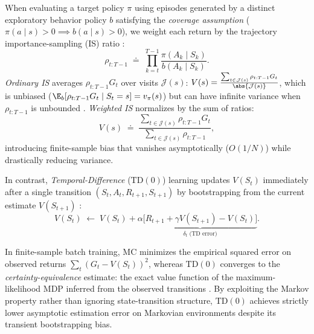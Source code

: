\documentclass[../../../../master.tex]{subfiles}
\begin{document}
When evaluating a target policy $\pi$ using episodes generated by a distinct exploratory behavior policy $b$ satisfying the \emph{coverage assumption} ($\pi(a \mid s) > 0 \implies b(a \mid s) > 0$), we weight each return by the trajectory importance-sampling (IS) ratio :
\begin{equation}
  \rho_{t:T-1} \;\doteq\; \prod_{k=t}^{T-1} \frac{\pi(A_k \mid S_k)}{b(A_k \mid S_k)}.
  \label{eq:td:is_ratio}
\end{equation}
\emph{Ordinary IS} averages $\rho_{t:T-1} G_t$ over visits $\mathcal{J}(s)$: $V(s) = \frac{\sum_{t \in \mathcal{J}(s)} \rho_{t:T-1} G_t}{\abs{\mathcal{J}(s)}}$, which is unbiased ($\E_b[\rho_{t:T-1} G_t \mid S_t = s] = v_\pi(s)$) but can have infinite variance when $\rho_{t:T-1}$ is unbounded . \emph{Weighted IS} normalizes by the sum of ratios:
\begin{equation}
  V(s) \;\doteq\; \frac{\sum_{t \in \mathcal{J}(s)} \rho_{t:T-1} G_t}{\sum_{t \in \mathcal{J}(s)} \rho_{t:T-1}},
\end{equation}
introducing finite-sample bias that vanishes asymptotically ($O(1/N)$) while drastically reducing variance.

In contrast, \emph{Temporal-Difference} ($\mathrm{TD}(0)$) learning updates $V(S_t)$ immediately after a single transition $(S_t, A_t, R_{t+1}, S_{t+1})$ by bootstrapping from the current estimate $V(S_{t+1})$  :
\begin{equation}
  V(S_t) \;\leftarrow\; V(S_t) + \alpha \underbrace{\bigl[ R_{t+1} + \gamma V(S_{t+1}) - V(S_t) \bigr]}_{\delta_t \;\text{(TD error)}}.
  \label{eq:td:td0}
\end{equation}


\begin{intuition}
In finite-sample batch training, MC minimizes the empirical squared error on observed returns $\sum_t (G_t - V(S_t))^2$, whereas $\mathrm{TD}(0)$ converges to the \emph{certainty-equivalence} estimate: the exact value function of the maximum-likelihood MDP inferred from the observed transitions . By exploiting the Markov property rather than ignoring state-transition structure, $\mathrm{TD}(0)$ achieves strictly lower asymptotic estimation error on Markovian environments despite its transient bootstrapping bias.
\end{intuition}
\end{document}
